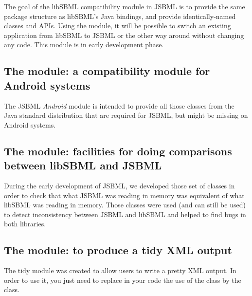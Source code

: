 The goal of the libSBML compatibility module in JSBML is to provide the
same package structure as libSBML's Java bindings, and provide
identically-named classes and APIs. Using the module, it will be possible
to switch an existing application from libSBML to JSBML or the other way
around without changing any code.  %
This module is in early development phase.

\subsection{The  module: a compatibility module for
  Android systems}

The JSBML \emph{Android} module is intended to provide all those classes
from the Java standard distribution that are required for JSBML, but might
be missing on Android systems.

\subsection{The  module: facilities for doing comparisons between libSBML and JSBML}

During the early development of JSBML, we developed those set of classes in order to check that what
JSBML was reading in memory was equivalent of what libSBML was reading in memory. Those classes were
used (and can still be used) to detect inconsistency between JSBML and libSBML and helped to find bugs
 in both libraries.

\subsection{The  module: to produce a tidy XML output}

The tidy module was created to allow users to write a pretty XML output. In order to use it, you just need to replace
in your code the use of the \SBMLWriter{} class by the \TidySBMLWriter{} class.
